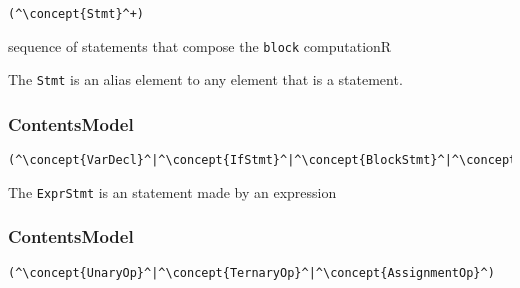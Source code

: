 \begin{lstlisting}[style=default]
(^\concept{Stmt}^+)
\end{lstlisting}

\begin{HIRChildElements}
	{sequence of statements that compose the {\tt block} computation}{R}
\end{HIRChildElements}

The {\tt Stmt} is an alias element to any element that is a statement. 

\subsubsection*{ContentsModel}{}

\begin{lstlisting}[style=default]
(^\concept{VarDecl}^|^\concept{IfStmt}^|^\concept{BlockStmt}^|^\concept{IfStmt}^|^\concept{ExprStmt}^)
\end{lstlisting}

The {\tt ExprStmt} is an statement made by an expression

\subsubsection*{ContentsModel}{}

\begin{lstlisting}[style=default]
(^\concept{UnaryOp}^|^\concept{TernaryOp}^|^\concept{AssignmentOp}^)
\end{lstlisting}
